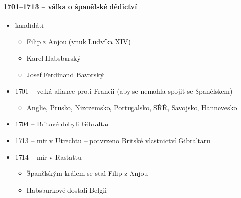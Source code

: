\paragraph{1701--1713 -- válka o španělské dědictví}
\begin{itemize}
\item kandidáti
	\begin{itemize}
	\item Filip z Anjou (vnuk Ludvíka XIV)
	\item Karel Habsburský
	\item Josef Ferdinand Bavorský
	\end{itemize}
\item 1701 -- velká aliance proti Francii (aby se nemohla spojit se Španělskem)
	\begin{itemize}
	\item Anglie, Prusko, Nizozemsko, Portugalsko, SŘŘ, Savojsko, Hannovesko
	\end{itemize}
\item 1704 -- Britové dobyli Gibraltar
\item 1713 -- mír v Utrechtu -- potvrzeno Britské vlastnictví Gibraltaru
\item 1714 -- mír v Rastattu
	\begin{itemize}
	\item Španělským králem se stal Filip z Anjou
	\item Habsburkové dostali Belgii
	\end{itemize}
\end{itemize}



\timeline
